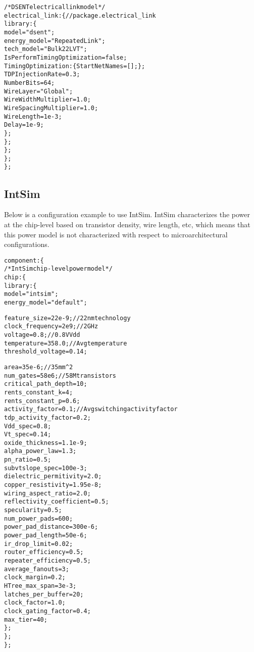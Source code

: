{\begin{alltt}
            /* DSENT electrical link model */
            electrical_link: \{ // package.electrical\_link
                library: \{
                    model = "dsent";
                    energy_model = "RepeatedLink";
                    tech_model = "Bulk22LVT";
                    IsPerformTimingOptimization = false;
                    TimingOptimization: \{ StartNetNames = []; \};
                    TDPInjectionRate = 0.3;
                    NumberBits = 64;
                    WireLayer = "Global";
                    WireWidthMultiplier = 1.0;
                    WireSpacingMultiplier = 1.0;
                    WireLength = 1e-3;
                    Delay = 1e-9;
                \};
            \};
        \};
    \};
\};
\end{alltt}
}

\pagebreak
\subsection{IntSim}
\noindent
Below is a configuration example to use IntSim. 
IntSim characterizes the power at the chip-level based on transistor density, wire length, etc, which means that this power model is not characterized with respect to microarchitectural configurations.
{
\fontsize{10pt}{11pt}\selectfont
\begin{alltt}
component: \{
    /* IntSim chip-level power model */
    chip: \{
        library: \{
            model = "intsim";
            energy_model = "default";
                        
            feature_size = 22e-9; // 22nm technology
            clock_frequency = 2e9; // 2GHz
            voltage = 0.8; // 0.8V Vdd
            temperature = 358.0; // Avg temperature
            threshold_voltage = 0.14;
            
            area = 35e-6; // 35mm^2 
            num_gates = 58e6; // 58M transistors
            critical_path_depth = 10;
            rents_constant_k = 4;
            rents_constant_p = 0.6;
            activity_factor = 0.1; // Avg switching activity factor
            tdp_activity_factor = 0.2;
            Vdd_spec = 0.8;
            Vt_spec = 0.14;
            oxide_thickness = 1.1e-9;
            alpha_power_law = 1.3;
            pn_ratio = 0.5;
            subvtslope_spec = 100e-3;
            dielectric_permitivity = 2.0;
            copper_resistivity = 1.95e-8;
            wiring_aspect_ratio = 2.0;
            reflectivity_coefficient = 0.5;
            specularity = 0.5;
            num_power_pads = 600;
            power_pad_distance = 300e-6;
            power_pad_length = 50e-6;
            ir_drop_limit = 0.02;
            router_efficiency = 0.5;
            repeater_efficiency = 0.5;
            average_fanouts = 3;
            clock_margin = 0.2;
            HTree_max_span = 3e-3;
            latches_per_buffer = 20;
            clock_factor = 1.0;
            clock_gating_factor = 0.4;
            max_tier = 40;
        \};
    \};
\};            
\end{alltt}
}

